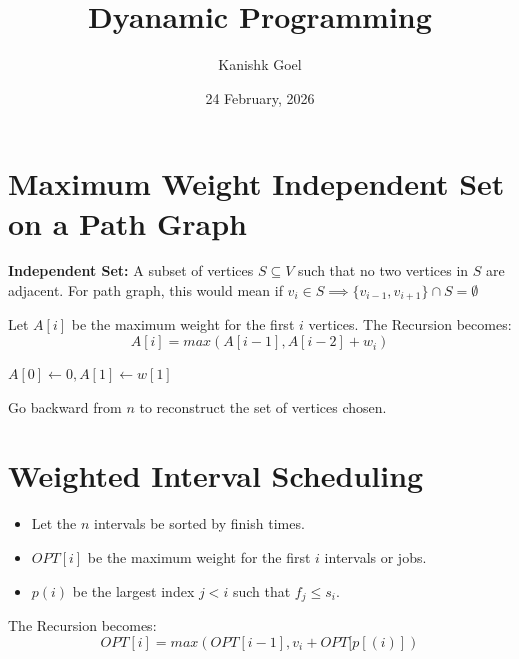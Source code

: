 \documentclass{article}
\title{Dyanamic Programming}
\author{Kanishk Goel}
\date{24 February, 2026}
\begin{document}
	\SetAlgoCaptionSeparator{}
	\renewcommand{\thealgocf}{} 
	\renewcommand{\AlCapNameFnt}{\bfseries}
	\renewcommand{\AlCapFnt}{}
	\DontPrintSemicolon
	\renewcommand{\algorithmcfname}{}
	\maketitle
	\SetAlgoNoEnd
	\section{Maximum Weight Independent Set on a Path Graph}
	
	\textbf{Independent Set:} A subset of vertices $S \subseteq V$ such that no two vertices in $S$ are adjacent. For path graph, this would mean if $v_i \in S \implies \{v_{i-1}, v_{i+1}\} \cap S = \emptyset$
	\vspace{3mm}
	
	\begin{algorithm}[H]
		\SetAlgoLined
		\caption{Problem: MWIS in path graph}
	\end{algorithm}
	\vspace{5mm}
	
	Let $A[i]$ be the maximum weight for the first $i$ vertices. The Recursion becomes:
	\[A[i] = max(A[i-1],A[i-2] + w_i)\]
	
	\begin{algorithm}[H]
		\SetAlgoLined
		\caption{Solution}
		$A[0] \leftarrow 0, A[1] \leftarrow w[1]$ \;
	\end{algorithm}
	\vspace{2mm}
	Go backward from $n$ to reconstruct the set of vertices chosen.
	
	\section{Weighted Interval Scheduling}
	\begin{algorithm}[H]
		\SetAlgoLined
		\caption{Problem: Weighted Interval Scheduling}
	\end{algorithm}	
	\vspace{5mm}
	\begin{itemize}
		\item Let the $n$ intervals be sorted by finish times.
		\item $OPT[i]$ be the maximum weight for the first $i$ intervals or jobs.
		\item $p(i)$ be the largest index $j < i$ such that $f_j \leq s_i$.
	\end{itemize}
	The Recursion becomes:
	\[OPT[i] = max(OPT[i-1], v_i + OPT[p[(i)])\]
	
\end{document}
